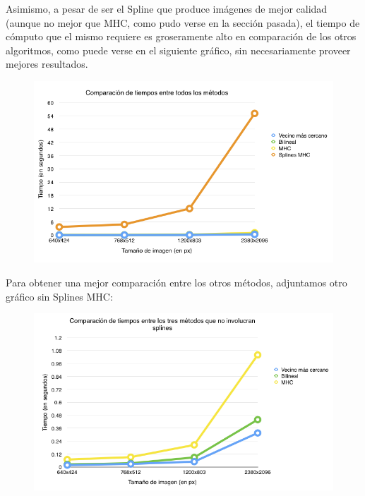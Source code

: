 \documentclass[a4paper]{article}
\begin{document}
Asimismo, a pesar de ser el Spline que produce imágenes de mejor calidad (aunque no mejor que MHC, como pudo verse en la sección pasada), el tiempo de cómputo que el mismo requiere es groseramente alto en comparación de los otros algoritmos, como puede verse en el siguiente gráfico, sin necesariamente proveer mejores resultados.

\begin{figure}[h!]
    \begin{center}
    \includegraphics[scale=0.65]{imagenes/tiempos/todosg.png}
    \label{tiempos1}
  \end{center}
\end{figure}

Para obtener una mejor comparación entre los otros métodos, adjuntamos otro gráfico sin Splines MHC:

\begin{figure}[h!]
    \begin{center}
    \includegraphics[scale=0.65]{imagenes/tiempos/sinspline.png}
    \label{tiempos2}
  \end{center}
\end{figure}
\pagebreak
\end{document}
